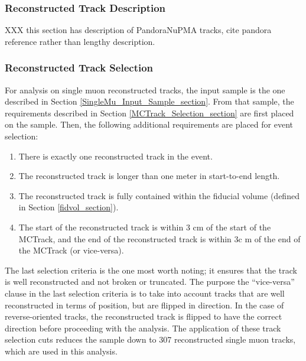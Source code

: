 \subsubsection{Reconstructed Track Description}\label{RecoTrack_section}
XXX this section has description of PandoraNuPMA tracks, cite pandora reference rather than lengthy description.

\subsubsection{Reconstructed Track Selection}\label{RecoTrack_Selection_section}
For analysis on single muon reconstructed tracks, the input sample is the one described in Section \ref{SingleMu_Input_Sample_section}. From that sample, the requirements described in Section \ref{MCTrack_Selection_section} are first placed on the sample. Then, the following additional requirements are placed for event selection:
\begin{enumerate}
	\item There is exactly one reconstructed track in the event.
	\item The reconstructed track is longer than one meter in start-to-end length.
	\item The reconstructed track is fully contained within the fiducial volume (defined in Section \ref{fidvol_section}).
	\item The start of the reconstructed track is within 3 cm of the start of the {\sc MCTrack}, and the end of the reconstructed track is within 3c m of the end of the {\sc MCTrack} (or vice-versa).
\end{enumerate}
The last selection criteria is the one most worth noting; it ensures that the track is well reconstructed and not broken or truncated. The purpose the ``vice-versa'' clause in the last selection criteria is to take into account tracks that are well reconstructed in terms of position, but are flipped in direction. In the case of reverse-oriented tracks, the reconstructed track is flipped to have the correct direction before proceeding with the analysis. The application of these track selection cuts reduces the sample down to 307 reconstructed single muon tracks, which are used in this analysis.



